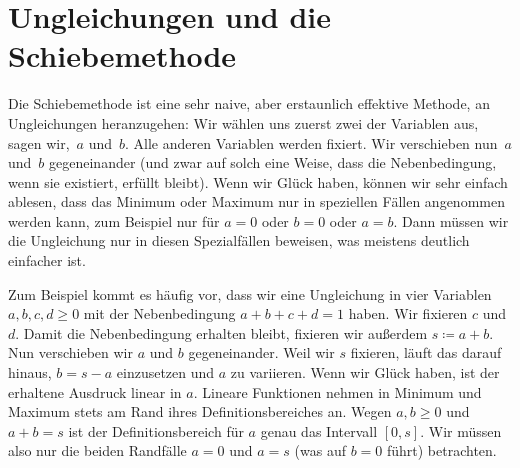 \section{Ungleichungen und die Schiebemethode}\label{kapitel:Schiebemethode}

Die Schiebemethode ist eine sehr naive, aber erstaunlich effektive Methode, an Ungleichungen heranzugehen: Wir wählen uns zuerst zwei der Variablen aus, sagen wir,~$a$ und~$b$. Alle anderen Variablen werden fixiert. Wir verschieben nun~$a$ und~$b$ gegeneinander (und zwar auf solch eine Weise, dass die Nebenbedingung, wenn sie existiert, erfüllt bleibt). Wenn wir Glück haben, können wir sehr einfach ablesen, dass das Minimum oder Maximum nur in speziellen Fällen angenommen werden kann, zum Beispiel nur für $a=0$ oder $b=0$ oder $a=b$. Dann müssen wir die Ungleichung nur in diesen Spezialfällen beweisen, was meistens deutlich einfacher ist.

Zum Beispiel kommt es häufig vor, dass wir eine Ungleichung in vier Variablen $a,b,c,d\geqslant 0$ mit der Nebenbedingung $a+b+c+d=1$ haben. Wir fixieren $c$ und $d$. Damit die Nebenbedingung erhalten bleibt, fixieren wir außerdem $s\coloneqq a+b$. Nun verschieben wir $a$ und $b$ gegeneinander. Weil wir $s$ fixieren, läuft das darauf hinaus, $b=s-a$ einzusetzen und $a$ zu variieren. Wenn wir Glück haben, ist der erhaltene Ausdruck linear in $a$. Lineare Funktionen nehmen in Minimum und Maximum stets am Rand ihres Definitionsbereiches an. Wegen $a,b\geqslant 0$ und $a+b=s$ ist der Definitionsbereich für $a$ genau das Intervall $[0,s]$. Wir müssen also nur die beiden Randfälle $a=0$ und $a=s$ (was auf $b=0$ führt) betrachten.

